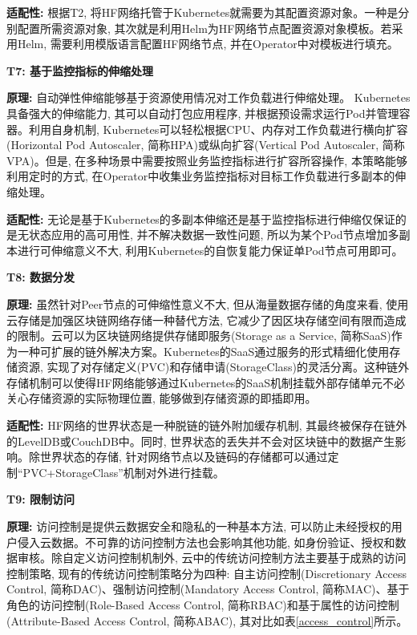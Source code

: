 \textbf{适配性: } 根据T2, 将HF网络托管于Kubernetes就需要为其配置资源对象。一种是分别配置所需资源对象, 其次就是利用Helm为HF网络节点配置资源对象模板。若采用Helm, 需要利用模版语言配置HF网络节点, 并在Operator中对模板进行填充。


\textbf{T7: 基于监控指标的伸缩处理}

\textbf{原理: } 自动弹性伸缩能够基于资源使用情况对工作负载进行伸缩处理。 Kubernetes具备强大的伸缩能力, 其可以自动打包应用程序, 并根据预设需求运行Pod并管理容器。利用自身机制, Kubernetes可以轻松根据CPU、内存对工作负载进行横向扩容(Horizontal Pod Autoscaler, 简称HPA)或纵向扩容(Vertical Pod Autoscaler, 简称VPA)。但是, 在多种场景中需要按照业务监控指标进行扩容所容操作, 本策略能够利用定时的方式, 在Operator中收集业务监控指标对目标工作负载进行多副本的伸缩处理。

\textbf{适配性: } 无论是基于Kubernetes的多副本伸缩还是基于监控指标进行伸缩仅保证的是无状态应用的高可用性, 并不解决数据一致性问题, 所以为某个Pod节点增加多副本进行可伸缩意义不大, 利用Kubernetes的自恢复能力保证单Pod节点可用即可。

\textbf{T8: 数据分发}

\textbf{原理: } 虽然针对Peer节点的可伸缩性意义不大, 但从海量数据存储的角度来看, 使用云存储是加强区块链网络存储一种替代方法, 它减少了因区块存储空间有限而造成的限制\cite{gai2020blockchain}。云可以为区块链网络提供存储即服务(Storage as a Service, 简称SaaS)作为一种可扩展的链外解决方案。Kubernetes的SaaS通过服务的形式精细化使用存储资源, 实现了对存储定义(PVC)和存储申请(StorageClass)的灵活分离。这种链外存储机制可以使得HF网络能够通过Kubernetes的SaaS机制挂载外部存储单元不必关心存储资源的实际物理位置, 能够做到存储资源的即插即用。 

\textbf{适配性: }HF网络的世界状态是一种脱链的链外附加缓存机制, 其最终被保存在链外的LevelDB或CouchDB中。同时, 世界状态的丢失并不会对区块链中的数据产生影响。除世界状态的存储, 针对网络节点以及链码的存储都可以通过定制“PVC+StorageClass”机制对外进行挂载。

\textbf{T9: 限制访问}

\textbf{原理: }访问控制是提供云数据安全和隐私的一种基本方法, 可以防止未经授权的用户侵入云数据。不可靠的访问控制方法也会影响其他功能, 如身份验证、授权和数据审核。除自定义访问控制机制外, 云中的传统访问控制方法主要基于成熟的访问控制策略, 现有的传统访问控制策略分为四种: 自主访问控制(Discretionary Access Control, 简称DAC)、强制访问控制(Mandatory Access Control, 简称MAC)、基于角色的访问控制(Role-Based Access Control, 简称RBAC)和基于属性的访问控制(Attribute-Based Access Control, 简称ABAC), 其对比如表\ref{access_control}所示。

